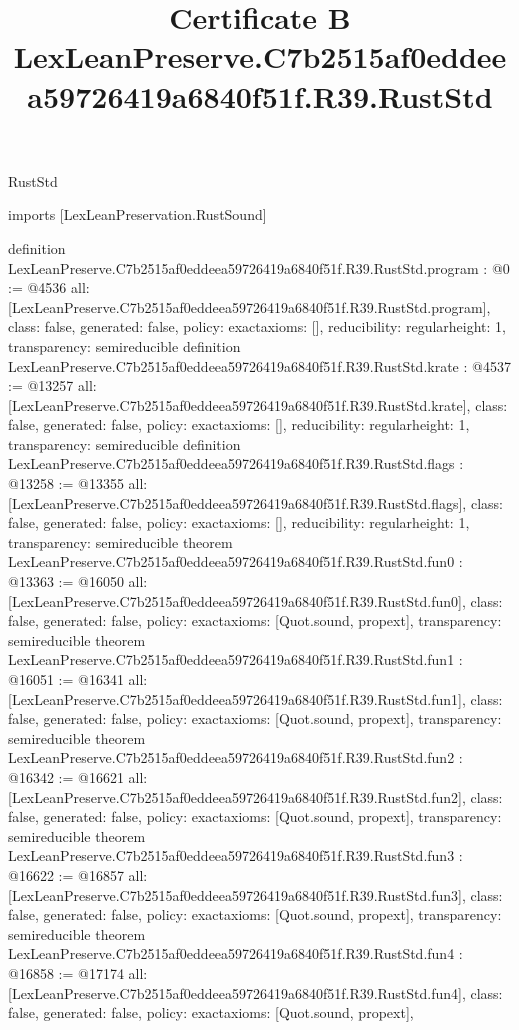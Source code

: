 \begin{lexlean}{RustStd}
\title{Certificate B LexLeanPreserve.C7b2515af0eddeea59726419a6840f51f.R39.RustStd}
\begin{coremodule}
imports [LexLeanPreservation.RustSound]

definition LexLeanPreserve.C7b2515af0eddeea59726419a6840f51f.R39.RustStd.program : @0 := @4536 {
  all: [LexLeanPreserve.C7b2515af0eddeea59726419a6840f51f.R39.RustStd.program],
  class: false,
  generated: false,
  policy: exact{axioms: []},
  reducibility: regular{height: 1},
  transparency: semireducible
}
definition LexLeanPreserve.C7b2515af0eddeea59726419a6840f51f.R39.RustStd.krate : @4537 := @13257 {
  all: [LexLeanPreserve.C7b2515af0eddeea59726419a6840f51f.R39.RustStd.krate],
  class: false,
  generated: false,
  policy: exact{axioms: []},
  reducibility: regular{height: 1},
  transparency: semireducible
}
definition LexLeanPreserve.C7b2515af0eddeea59726419a6840f51f.R39.RustStd.flags : @13258 := @13355 {
  all: [LexLeanPreserve.C7b2515af0eddeea59726419a6840f51f.R39.RustStd.flags],
  class: false,
  generated: false,
  policy: exact{axioms: []},
  reducibility: regular{height: 1},
  transparency: semireducible
}
theorem LexLeanPreserve.C7b2515af0eddeea59726419a6840f51f.R39.RustStd.fun0 : @13363 := @16050 {
  all: [LexLeanPreserve.C7b2515af0eddeea59726419a6840f51f.R39.RustStd.fun0],
  class: false,
  generated: false,
  policy: exact{axioms: [Quot.sound, propext]},
  transparency: semireducible
}
theorem LexLeanPreserve.C7b2515af0eddeea59726419a6840f51f.R39.RustStd.fun1 : @16051 := @16341 {
  all: [LexLeanPreserve.C7b2515af0eddeea59726419a6840f51f.R39.RustStd.fun1],
  class: false,
  generated: false,
  policy: exact{axioms: [Quot.sound, propext]},
  transparency: semireducible
}
theorem LexLeanPreserve.C7b2515af0eddeea59726419a6840f51f.R39.RustStd.fun2 : @16342 := @16621 {
  all: [LexLeanPreserve.C7b2515af0eddeea59726419a6840f51f.R39.RustStd.fun2],
  class: false,
  generated: false,
  policy: exact{axioms: [Quot.sound, propext]},
  transparency: semireducible
}
theorem LexLeanPreserve.C7b2515af0eddeea59726419a6840f51f.R39.RustStd.fun3 : @16622 := @16857 {
  all: [LexLeanPreserve.C7b2515af0eddeea59726419a6840f51f.R39.RustStd.fun3],
  class: false,
  generated: false,
  policy: exact{axioms: [Quot.sound, propext]},
  transparency: semireducible
}
theorem LexLeanPreserve.C7b2515af0eddeea59726419a6840f51f.R39.RustStd.fun4 : @16858 := @17174 {
  all: [LexLeanPreserve.C7b2515af0eddeea59726419a6840f51f.R39.RustStd.fun4],
  class: false,
  generated: false,
  policy: exact{axioms: [Quot.sound, propext]},
}
\end{coremodule}
\end{lexlean}
